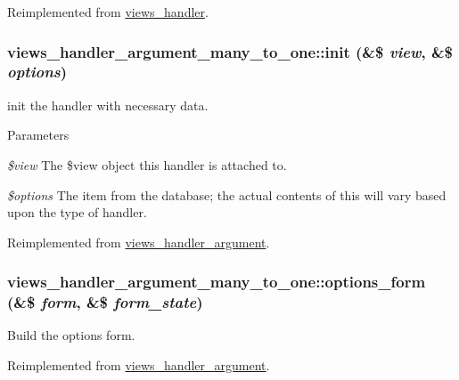 Reimplemented from \hyperlink{classviews__handler_a947f21ef0f21a77f4d103af4702b3600}{views\_\-handler}.\hypertarget{classviews__handler__argument__many__to__one_aec928c8a20acec1623938ab177dbfc8f}{
\subsubsection[{init}]{\setlength{\rightskip}{0pt plus 5cm}views\_\-handler\_\-argument\_\-many\_\-to\_\-one::init (\&\$ {\em view}, \/  \&\$ {\em options})}}
\label{classviews__handler__argument__many__to__one_aec928c8a20acec1623938ab177dbfc8f}
init the handler with necessary data. 
\begin{DoxyParams}{Parameters}
\item[{\em \$view}]The \$view object this handler is attached to. \item[{\em \$options}]The item from the database; the actual contents of this will vary based upon the type of handler. \end{DoxyParams}


Reimplemented from \hyperlink{classviews__handler__argument_a2c7e59a9df090d59d9d7d2827b6da85a}{views\_\-handler\_\-argument}.\hypertarget{classviews__handler__argument__many__to__one_add3ed7d59f17d79f48ef8f47e049cb92}{
\subsubsection[{options\_\-form}]{\setlength{\rightskip}{0pt plus 5cm}views\_\-handler\_\-argument\_\-many\_\-to\_\-one::options\_\-form (\&\$ {\em form}, \/  \&\$ {\em form\_\-state})}}
\label{classviews__handler__argument__many__to__one_add3ed7d59f17d79f48ef8f47e049cb92}
Build the options form. 

Reimplemented from \hyperlink{classviews__handler__argument_a44f015a0d527983ae6df2689f66b2c24}{views\_\-handler\_\-argument}.

